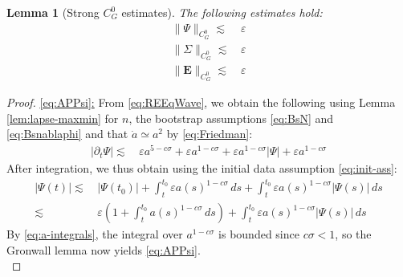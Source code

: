 \documentclass[11pt,leqno,textwidth=10cm]{amsart}
\numberwithin{equation}{section}
\theoremstyle{definition}
\theoremstyle{plain}
\newtheorem{lemma}[definition]{Lemma}
\newcommand{\1}{\mathbbm{1}}
\renewcommand{\epsilon}{\varepsilon}
\newcommand{\del}{\partial}
\newcommand{\Lap}{\Delta}
\newcommand{\RE}{\bm{E}}
\begin{document}
\begin{lemma}[Strong $C^0_G$ estimates]\label{lem:APzero}The following estimates hold:
\begin{subequations}
\begin{align}
\|\Psi\|_{C^0_G}\lesssim&\,\epsilon\label{eq:APPsi}\\
\|\Sigma\|_{C^0_G}\lesssim&\,\epsilon\label{eq:APSigma}\\
\|\RE\|_{C^0_G}\lesssim&\,\epsilon\label{eq:APE}
\end{align}
\end{subequations}
\end{lemma}
\begin{proof}
\underline{\eqref{eq:APPsi}:} From \eqref{eq:REEqWave}, we obtain the following using Lemma \ref{lem:lapse-maxmin} for $n$, the bootstrap assumptions \eqref{eq:BsN} and \eqref{eq:Bsnablaphi} and that $\dot{a}\simeq a^2$ by \eqref{eq:Friedman}:
\begin{align*}
\lvert\del_t\Psi\rvert%
\lesssim&\,\epsilon a^{5-c\sigma}+\epsilon a^{1-c\sigma}+\epsilon a^{1-c\sigma}\lvert\Psi\rvert+{\epsilon} a^{1-c\sigma}
\end{align*}
After integration, we thus obtain using the initial data assumption \eqref{eq:init-ass}:
\begin{align*}
\lvert\Psi(t)\rvert\lesssim&\,\lvert\Psi(t_0)\rvert+\int_t^{t_0}\epsilon a(s)^{1-c\sigma}\,ds+\int_t^{t_0}{\epsilon} a(s)^{1-c\sigma}\lvert\Psi(s)\rvert\,ds\\
\lesssim&\,\epsilon\left(1+\int_t^{t_0}a(s)^{1-c\sigma}\,ds\right)+\int_t^{t_0}{\epsilon}a(s)^{1-c\sigma}\lvert\Psi(s)\rvert\,ds
\end{align*}
By \eqref{eq:a-integrals}, the integral over $a^{1-c\sigma}$ is bounded since $c\sigma<1$, so the Gronwall lemma now yields \eqref{eq:APPsi}.\\


\end{proof}
\end{document}

